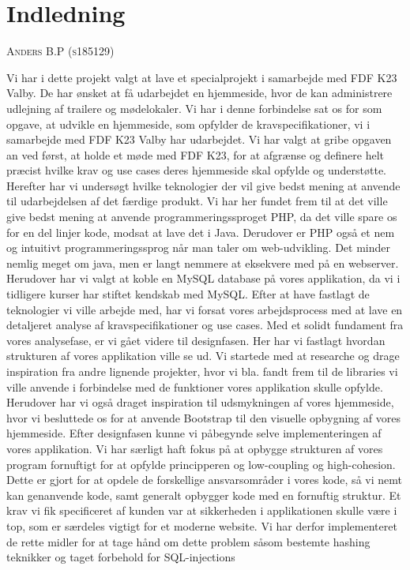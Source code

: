 \documentclass[12pt,a4paper]{report} %
\makeatletter
\newcommand\chapterauthor[1]{\authortoc{#1}\printchapterauthor{#1}}
\newcommand{\printchapterauthor}[1]{%
  {\parindent0pt\vspace*{-25pt}%
  \linespread{1.1}\large\scshape#1%
  \par\nobreak\vspace*{35pt}}
  \@afterheading%
}
\newcommand{\authortoc}[1]{%
  \addtocontents{toc}{\vskip-10pt}%
  \addtocontents{toc}{%
    \protect\contentsline{chapter}%
    {\hskip1.3em\mdseries\scshape\protect\scriptsize#1}{}{}}
  \addtocontents{toc}{\vskip5pt}%
}
\makeatother
\begin{document}
    \chapter{Indledning}
    \chapterauthor{Anders B.P (s185129)}
    Vi har i dette projekt valgt at lave et specialprojekt i samarbejde med FDF K23 Valby. De har ønsket at få udarbejdet en hjemmeside, hvor de kan administrere udlejning af trailere og mødelokaler. 
    Vi har i denne forbindelse sat os for som opgave, at udvikle en hjemmeside, som opfylder de kravspecifikationer, vi i samarbejde med FDF K23 Valby har udarbejdet.
    Vi har valgt at gribe opgaven an ved først, at holde et møde med FDF K23, for at afgrænse og definere helt præcist hvilke krav og use cases deres hjemmeside skal opfylde og understøtte. 
    \newline
    \newline Herefter har vi undersøgt hvilke teknologier der vil give bedst mening at anvende til udarbejdelsen af det færdige produkt. Vi har her fundet frem til at det ville give bedst mening at anvende programmeringssproget PHP, da det ville spare os for en del linjer kode, modsat at lave det i Java. Derudover er PHP også et nem og intuitivt programmeringssprog når man taler om web-udvikling. Det minder nemlig meget om java, men er langt nemmere at eksekvere med på en webserver. Herudover har vi valgt at koble en MySQL database på vores applikation, da vi i tidligere kurser har stiftet kendskab med MySQL. 
    \newline
    \newline Efter at have fastlagt de teknologier vi ville arbejde med, har vi forsat vores arbejdsprocess med at lave en detaljeret analyse af kravspecifikationer og use cases. 
    \newline Med et solidt fundament fra vores analysefase, er vi gået videre til designfasen. Her har vi fastlagt hvordan strukturen af vores applikation ville se ud. Vi startede med at researche og drage inspiration fra andre lignende projekter, hvor vi bla. fandt frem til de libraries vi ville anvende i forbindelse med de funktioner vores applikation skulle opfylde. Herudover har vi også draget inspiration til udsmykningen af vores hjemmeside, hvor vi besluttede os for at anvende Bootstrap til den visuelle opbygning af vores hjemmeside. 
    \newline 
    \newline Efter designfasen kunne vi påbegynde selve implementeringen af vores applikation. Vi har særligt haft fokus på at opbygge strukturen af vores program fornuftigt for at opfylde principperen og low-coupling og high-cohesion. Dette er gjort for at opdele de forskellige ansvarsområder i vores kode, så vi nemt kan genanvende kode, samt generalt opbygger kode med en fornuftig struktur. 
    \newline Et krav vi fik specificeret af kunden var at sikkerheden i applikationen skulle være i top, som er særdeles vigtigt for et moderne website. Vi har derfor implementeret de rette midler for at tage hånd om dette problem såsom bestemte hashing teknikker og taget forbehold for SQL-injections
    
\end{document}
